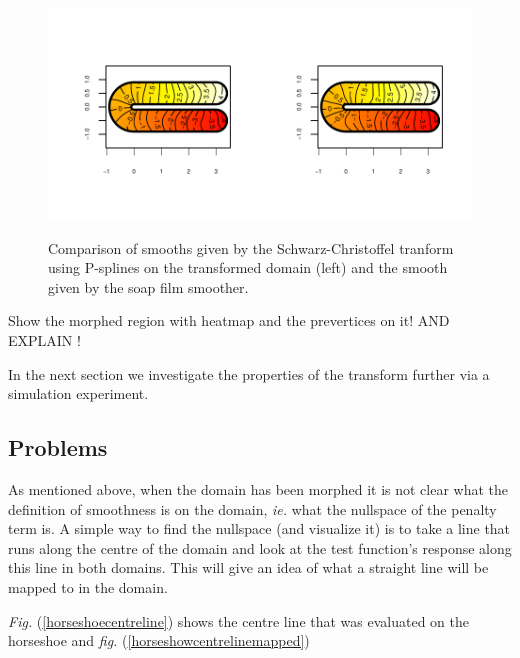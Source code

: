 \documentclass[a4paper,10pt]{amsart}
\newcommand{\sch}{Schwarz-Christoffel }
\newcommand{\fig}[1]{\emph{fig.} (\ref{#1})}
\newcommand{\Fig}[1]{\emph{Fig.} (\ref{#1})}
\begin{document}
\begin{figure}
\centering
\includegraphics[trim=0.5in 0.5in 0in 0in]{figs/compsmooth.pdf} \\
\caption{Comparison of smooths given by the \sch tranform using P-splines on the transformed domain (left) and the smooth given by the soap film smoother.}
\label{compsmooth}
\end{figure}



Show the morphed region with heatmap and the prevertices on it! AND EXPLAIN !



In the next section we investigate the properties of the transform further via a simulation experiment.







\subsection{Problems}

As mentioned above, when the domain has been morphed it is not clear what the definition of smoothness is on the domain, \emph{ie.} what the nullspace of the penalty term is. A simple way to find the nullspace (and visualize it) is to take a line that runs along the centre of the domain and look at the test function's response along this line in both domains. This will give an idea of what a straight line will be mapped to in the domain.

\Fig{horseshoecentreline} shows the centre line that was evaluated on the horseshoe and \fig{horseshowcentrelinemapped}
\end{document}
